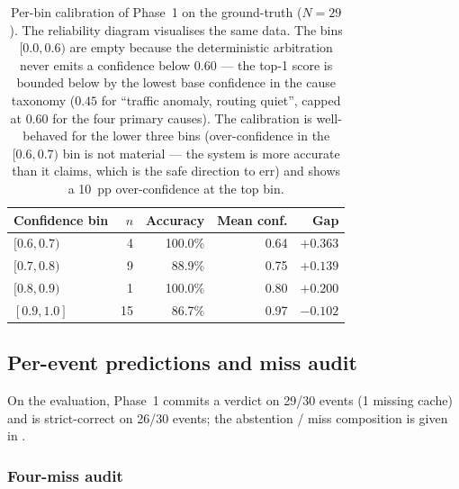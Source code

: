 \begin{table}[t]
\centering
\small
\setlength{\tabcolsep}{4pt}
\begin{tabular}{lrrrr}
\hline
Confidence bin & $n$ & Accuracy & Mean conf. & Gap \\ \hline
$[0.6, 0.7)$ & 4 & 100.0\% & 0.64 & $+0.363$ \\
$[0.7, 0.8)$ & 9 & 88.9\%  & 0.75 & $+0.139$ \\
$[0.8, 0.9)$ & 1 & 100.0\% & 0.80 & $+0.200$ \\
$[0.9, 1.0]$ & 15 & 86.7\%  & 0.97 & $-0.102$ \\
\hline
\end{tabular}
\caption{Per-bin calibration of Phase~1 on the
ground-truth ($N{=}29$). The reliability diagram
visualises the same data. The bins $[0.0, 0.6)$
are empty because the deterministic arbitration
never emits a confidence below 0.60 --- the
top-1 score is bounded below by the lowest base
confidence in the cause taxonomy ($0.45$ for
``traffic anomaly, routing quiet'', capped at
$0.60$ for the four primary causes). The
calibration is well-behaved for the lower three
bins (over-confidence in the $[0.6, 0.7)$ bin is
not material --- the system is more accurate
than it claims, which is the safe direction to
err) and shows a 10~pp over-confidence at the
top bin.}
\label{tab:calibration}
\end{table}

\subsection{Per-event predictions and miss audit}
\label{sec:per-event}

On the evaluation, Phase~1 commits a verdict on
29/30 events (1 missing cache) and is strict-correct on
26/30 events; the abstention / miss composition is
given in .

\subsubsection{Four-miss audit}
\label{sec:misses}

